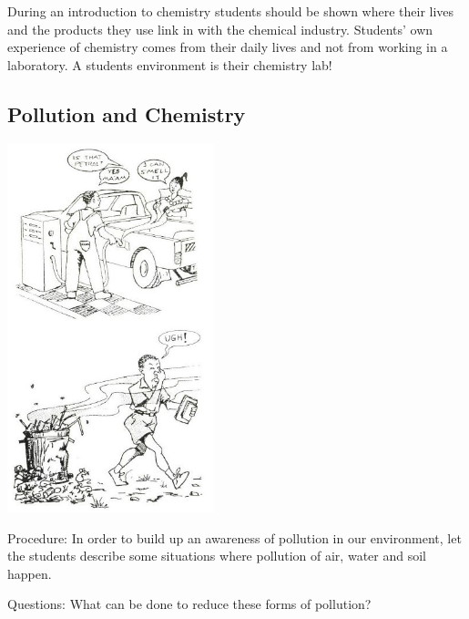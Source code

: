 \begin{multicols}{2}
\columnbreak

During an introduction to chemistry students
should be shown where their lives and the
products they use link in with the chemical
industry.
Students' own experience of chemistry comes
from their daily lives and not from working in a
laboratory. A students environment is their
chemistry lab!

\subsection{Pollution and Chemistry}

\begin{center}
\includegraphics[width=0.45\textwidth]{./img/source/chemical-pollution.jpg}
\end{center}

\begin{description*}
\item[Procedure:]{In order to build up an awareness of pollution
in our environment, let the students describe
some situations where pollution of air, water
and soil happen.}
\item[Questions:]{What can be done to reduce these forms of pollution?}
\end{description*}


\end{multicols}
